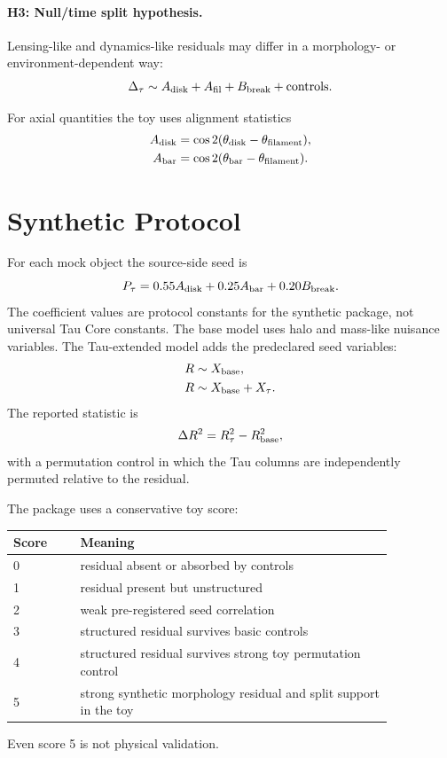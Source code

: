 \documentclass[11pt]{article}
\begin{document}
\paragraph{H3: Null/time split hypothesis.}
Lensing-like and dynamics-like residuals may differ in a morphology- or
environment-dependent way:
\[
  \Delta_{\tau}
  \sim
  A_{\rm disk}+A_{\rm fil}+B_{\rm break}+{\rm controls}.
\]

For axial quantities the toy uses alignment statistics
\begin{align}
  A_{\rm disk} &= \cos 2(\theta_{\rm disk}-\theta_{\rm filament}),\\
  A_{\rm bar}  &= \cos 2(\theta_{\rm bar}-\theta_{\rm filament}).
\end{align}

\section{Synthetic Protocol}

For each mock object the source-side seed is
\begin{equation}
  P_{\tau}
  =
  0.55 A_{\rm disk}
  +
  0.25 A_{\rm bar}
  +
  0.20 B_{\rm break}.
  \label{eq:ptau}
\end{equation}
The coefficient values are protocol constants for the synthetic package, not
universal Tau Core constants.  The base model uses halo and mass-like nuisance
variables.  The Tau-extended model adds the predeclared seed variables:
\begin{align}
  R &\sim X_{\rm base},\\
  R &\sim X_{\rm base}+X_{\tau}.
\end{align}
The reported statistic is
\begin{equation}
  \Delta R^2 = R^2_{\tau}-R^2_{\rm base},
\end{equation}
with a permutation control in which the Tau columns are independently
permuted relative to the residual.

The package uses a conservative toy score:
\begin{center}
\begin{tabular}{L{0.15\linewidth}L{0.70\linewidth}}
\toprule
Score & Meaning\\
 & residual absent or absorbed by controls\\
1 & residual present but unstructured\\
2 & weak pre-registered seed correlation\\
3 & structured residual survives basic controls\\
4 & structured residual survives strong toy permutation control\\
5 & strong synthetic morphology residual and split support in the toy\\
\bottomrule
\end{tabular}
\end{center}
Even score 5 is not physical validation.
\end{document}
